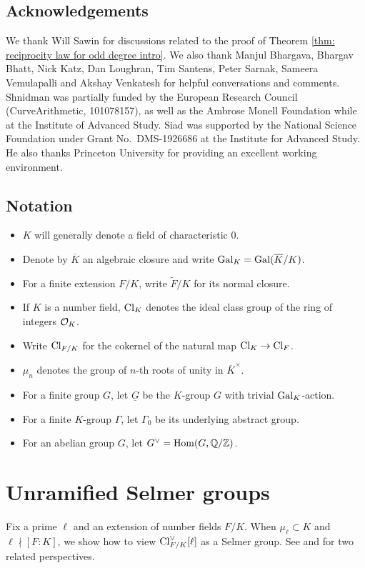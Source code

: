 \documentclass[11pt,a4paper]{amsart}
\def\Z{{\rm \mathbb{Z}}}
\def\Q{{\rm \mathbb{Q}}}
\def\O{{\rm \mathcal{O}}}
\def\Cl{{\rm Cl}}
\def\Gal{{\rm Gal}}
\def\Hom{{\rm Hom}}
\numberwithin{equation}{section}
\begin{document}
\subsection{Acknowledgements}
We thank Will Sawin for discussions related to the proof of Theorem \ref{thm: reciprocity law for odd degree intro}. We also thank Manjul Bhargava, Bhargav Bhatt, Nick Katz, Dan Loughran, Tim Santens, Peter Sarnak, Sameera Vemulapalli and Akshay Venkatesh for helpful conversations and comments. Shnidman was partially funded by the European Research Council (CurveArithmetic, 101078157), as well as the Ambrose Monell Foundation while at the Institute of Advanced Study.  Siad was supported by the National Science Foundation under Grant No.\ DMS-1926686 at the Institute for Advanced Study. He also thanks Princeton University for providing an excellent working environment. 

\subsection{Notation}
\begin{itemize}
    \item $K$ will generally denote a field of characteristic $0$.  
    \item Denote by $\overline{K}$ an algebraic closure and write $\Gal_K = \Gal(\overline{K}/K)$.  
    \item For a finite extension $F/K$, write $\tilde F/K$ for its normal closure.
    \item If $K$ is a number field,  $\Cl_K$ denotes the ideal class group of the ring of integers $\O_K$.
    \item Write $\Cl_{F/K}$ for the cokernel of the natural map $\Cl_K \to \Cl_F$. 
    \item $\mu_n$ denotes the group of $n$-th roots of unity in $\overline{K}^\times$. 
    \item For a finite group $G$, let $\underline{G}$ be the $K$-group $G$ with trivial $\Gal_K$-action. 
    \item For a finite $K$-group $\Gamma$, let $\Gamma_0$ be its underlying abstract group. 
    \item For an abelian group $G$, let $G^\vee = \Hom(G, \Q/\Z)$.

\end{itemize}

\section{Unramified Selmer groups}
Fix a prime $\ell$ and an extension of number fields $F/K$. When $\mu_\ell \subset K$ and $\ell\nmid [F \colon K]$, we show how to view $\Cl_{F/K}^\vee[\ell]$ as a Selmer group. See \cite{DummitVoight} and \cite{LipnowskiSawinTsimerman} for two related perspectives.
\end{document}
